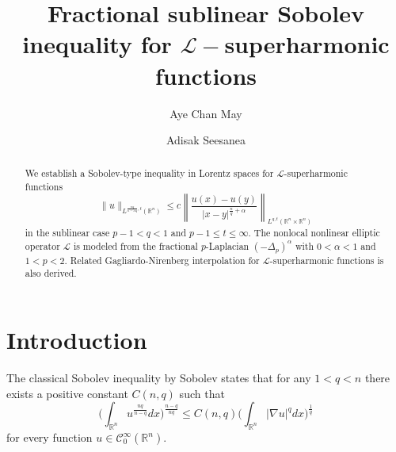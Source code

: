 \documentclass[12pt]{amsart}
\newcommand{\R}{\mathbb{R}}
\newcommand{\be}{\begin{equation}}
\newcommand{\ee}{\end{equation}}
\numberwithin{equation}{section}
\theoremstyle{plain}
\theoremstyle{definition}
\theoremstyle{remark}
\begin{document}
\title[Fractional Sublinear Sobolev inequality]
{Fractional sublinear Sobolev inequality for $\mathcal{L}-$superharmonic functions}
  
\author{Aye Chan May}
\address[Aye Chan May]{Sirindhorn International Institute of Technology, Thammasat University, Pathum Thani 12120, Thailand}

\author{Adisak Seesanea}
\address[Corresponding Author: Adisak Seesanea]{Sirindhorn International Institute of Technology, Thammasat University, Pathum Thani 12120, Thailand}

\maketitle
\begin{abstract}
We establish a Sobolev-type inequality in Lorentz spaces for $\mathcal{L}$-superharmonic functions
\[
\|u\|_{L^{\frac{nq}{n-\alpha q},t}(\mathbb{R}^n)} \leq c \left\| \frac{u(x) - u(y)}{|x-y|^{\frac{n}{q}+\alpha}} \right\|_{L^{q,t}(\mathbb{R}^n \times \mathbb{R}^n)}
\]
in the sublinear case $p-1 < q < 1$ and $p-1\leq t\leq \infty$. The nonlocal nonlinear elliptic operator 
$\mathcal{L}$ is modeled from the fractional $p$-Laplacian $(- \Delta_{p})^{\alpha} $ with $0 < \alpha < 1$
and $1<p<2$. Related Gagliardo-Nirenberg interpolation for $\mathcal{L}$-superharmonic functions is also derived.
\end{abstract}
\setcounter{tocdepth}{1}
\section{Introduction}\label{sect:intro} 

The classical Sobolev inequality by Sobolev \cite{So} states that for any $1<q<n$ there exists a positive constant $C(n,q)$ such that 
\be\label{standardsobolev}
\big(\int_{\mathbb{R}^{n}} u^{\frac{nq}{n-q}} dx \big)^{\frac{n-q}{nq}}\leq C(n,q)\big(\int_{\mathbb{R}^{n}} |\nabla u|^{q} dx\big)^{\frac{1}{q}}
\ee
for every function $u\in\mathcal{C}^{\infty}_{0}(\R^{n})$.
\end{document}
